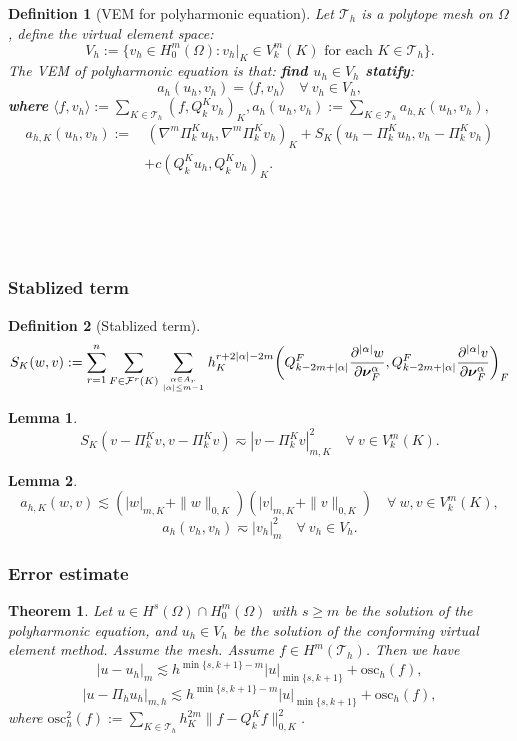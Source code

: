 \documentclass[notheorems,serif]{beamer}
\newtheorem{theorem}{\textbf{Theorem}}
\newtheorem{definition}{\textbf{Definition}}
\newtheorem{lemma}{\textbf{Lemma}}
\begin{document}
\begin{CJK}{UTF8}{gkai}
\begin{frame}
\begin{definition}[VEM for polyharmonic equation]
  Let $\mathcal{T}_h$ is a polytope mesh on $\Omega$, 
  define the virtual element space:
  $$
  V_h:=\{v_h\in H_0^m(\Omega): v_h|_K\in V_{k}^{m}(K) \textrm{ for each } K\in\mathcal T_h\}.
  $$
  The VEM of polyharmonic equation is that: {\bf find $u_h \in V_h$ statify}: 
  $$
  a_{h}(u_h, v_h)=\langle f, v_h\rangle\quad\forall~v_h\in V_h,
  $$
  {\bf where} $\langle f, v_h\rangle:=\sum\limits_{K\in\mathcal T_h}(f,
  Q_k^Kv_h)_K, a_h(u_h, v_h):=\sum_{K\in\mathcal T_h}a_{h,K}(u_h, v_h),$
  $$
  \begin{aligned}
  a_{h,K}(u_h, v_h):=&\,(\nabla^m\Pi_k^Ku_h,
  \nabla^m\Pi_k^Kv_h)_K+S_K(u_h-\Pi_k^Ku_h,v_h-\Pi_k^Kv_h) \\
  &+c(Q_k^Ku_h, Q_k^Kv_h)_K.
  \end{aligned}
  $$
\end{definition}
\hspace*{\fill} \\
\hspace*{\fill} \\
\hspace*{\fill} \\
\end{frame}

\begin{frame}
  \frametitle{Stablized term}
  \begin{definition}[Stablized term]
    \footnotesize{
    $$
    S_K(w,v):=\sum_{r=1}^{n}\sum_{F\in\mathcal F^{r}(K)}\sum_{\alpha\in A_{r}\atop
    |\alpha|\leq
    m-1}h_K^{r+2|\alpha|-2m}\bigg(Q_{k-2m+|\alpha|}^{F}\frac{\partial^{|\alpha|}w}{\partial
    \boldsymbol{\nu}_{F}^{\alpha}},Q_{k-2m+|\alpha|}^{F}\frac{\partial^{|\alpha|}v}{\partial
    \boldsymbol{\nu}_{F}^{\alpha}}\bigg)_{F}
    $$
  }
  \end{definition}
  \begin{lemma}
      $$
      S_K(v-\Pi_k^Kv,v-\Pi_k^Kv)\eqsim |v-\Pi_k^Kv|_{m,K}^2\quad\forall~v\in V_{k}^{m}(K).
      $$
  \end{lemma}
    \begin{lemma}
    $$
    a_{h,K}(w, v)\lesssim (|w|_{m,K}+\|w\|_{0,K})(|v|_{m,K}+\|v\|_{0,K})\quad\forall~w,v\in V_{k}^{m}(K),
    $$
    $$
    a_{h}(v_h, v_h)\eqsim |v_h|_{m}^2\quad\forall~v_h\in V_h.   
    $$
    \end{lemma}
\end{frame}


\begin{frame}
\frametitle{Error estimate}
\begin{theorem}\label{errorestimate}
Let $u\in H^s(\Omega)\cap H_0^m(\Omega)$ with $s\geq m$ be the solution of the
polyharmonic equation, and $u_h\in V_h$ be the solution
of the conforming virtual element method. Assume the mesh. Assume
$f\in H^m(\mathcal T_h)$. Then we have
$$
|u-u_h|_m\lesssim h^{\min\{s,k+1\}-m}|u|_{\min\{s,k+1\}}+\textrm{osc}_h(f),
$$
$$
|u-\Pi_hu_h|_{m,h}\lesssim h^{\min\{s,k+1\}-m}|u|_{\min\{s,k+1\}}+\textrm{osc}_h(f),
$$
where $\textrm{osc}_h^2(f):=\sum\limits_{K\in\mathcal T_h}h_K^{2m}\|f-Q_k^Kf\|_{0,K}^2$.
\end{theorem}


\end{frame}
\end{CJK}
\end{document}
